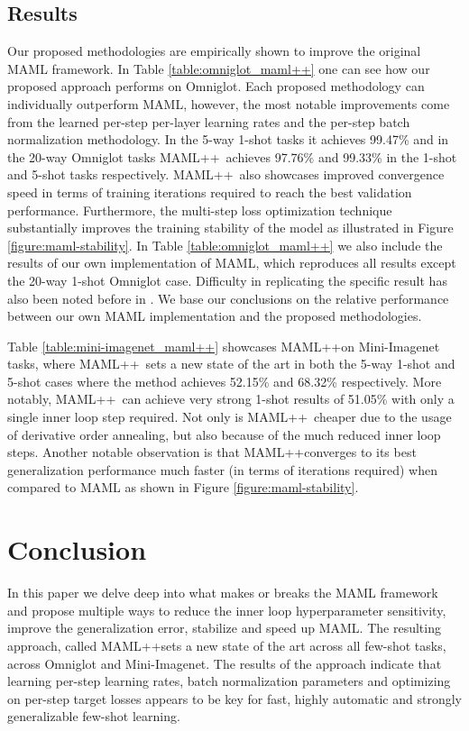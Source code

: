 \documentclass{article} \usepackage[dvipsnames]{xcolor}
\newcommand{\newmaml}{MAML++}
\begin{document}
\begin{table}[tbh]
	\label{table:mini-imagenet_maml++}
\end{table}





\subsection{Results}
Our proposed methodologies are empirically shown to improve the original MAML framework. In Table \ref{table:omniglot_maml++} one can see how our proposed approach performs on Omniglot. Each proposed methodology can individually outperform MAML, however, the most notable improvements come from the learned per-step per-layer learning rates and the per-step batch normalization methodology. In the 5-way 1-shot tasks it achieves 99.47\% and in the 20-way Omniglot tasks \newmaml\ achieves 97.76\% and 99.33\% in the 1-shot and 5-shot tasks respectively. \newmaml\ also showcases improved convergence speed in terms of training iterations required to reach the best validation performance. Furthermore, the multi-step loss optimization technique substantially improves the training stability of the model as illustrated in Figure \ref{figure:maml-stability}. In Table \ref{table:omniglot_maml++} we also include the results of our own implementation of MAML, which reproduces all results except the 20-way 1-shot Omniglot case. Difficulty in replicating the specific result has also been noted before in \cite{jamal2018task}. We base our conclusions on the relative performance between our own MAML implementation and the proposed methodologies.

Table \ref{table:mini-imagenet_maml++} showcases \newmaml on Mini-Imagenet tasks, where \newmaml\ sets a new state of the art in both the 5-way 1-shot and 5-shot cases where the method achieves 52.15\% and 68.32\% respectively. More notably, \newmaml\ can achieve very strong 1-shot results of 51.05\% with only a single inner loop step required. Not only is \newmaml\ cheaper due to the usage of derivative order annealing, but also because of the much reduced inner loop steps. Another notable observation is that \newmaml converges to its best generalization performance much faster (in terms of iterations required) when compared to MAML as shown in Figure \ref{figure:maml-stability}.

\section{Conclusion}
In this paper we delve deep into what makes or breaks the MAML framework and propose multiple ways to reduce the inner loop hyperparameter sensitivity, improve the generalization error, stabilize and speed up MAML. The resulting approach, called \newmaml sets a new state of the art across all few-shot tasks, across Omniglot and Mini-Imagenet. The results of the approach indicate that learning per-step learning rates, batch normalization parameters and optimizing on per-step target losses appears to be key for fast, highly automatic and strongly generalizable few-shot learning. 
\end{document}
